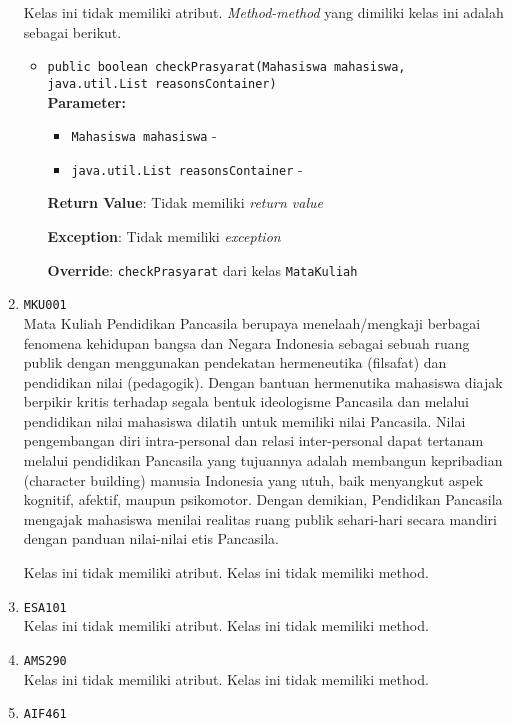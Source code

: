 \documentclass{article}
\begin{document}
\begin{enumerate}
Kelas ini tidak memiliki atribut. \textit{Method-method} yang dimiliki kelas ini adalah sebagai berikut.
\begin{itemize}
\item \texttt{public boolean checkPrasyarat(Mahasiswa mahasiswa, java.util.List reasonsContainer)}\\ 


\textbf{Parameter:}\begin{itemize}
\item \texttt{Mahasiswa mahasiswa} - 
\item \texttt{java.util.List reasonsContainer} - 
\end{itemize}
\textbf{Return Value}: Tidak memiliki \textit{return value}

\textbf{Exception}: Tidak memiliki \textit{exception}

\textbf{Override}: \texttt{checkPrasyarat} dari kelas \texttt{MataKuliah}

\end{itemize}
\item \texttt{MKU001}\\ 
Mata Kuliah Pendidikan Pancasila berupaya menelaah/mengkaji berbagai fenomena kehidupan 
 bangsa dan Negara Indonesia sebagai sebuah ruang publik dengan menggunakan pendekatan 
 hermeneutika (filsafat) dan pendidikan nilai (pedagogik). Dengan bantuan hermenutika
 mahasiswa diajak berpikir kritis terhadap segala bentuk ideologisme Pancasila dan melalui 
 pendidikan nilai mahasiswa dilatih untuk memiliki nilai Pancasila. Nilai pengembangan diri 
 intra-personal dan relasi inter-personal dapat tertanam melalui pendidikan Pancasila yang 
 tujuannya adalah membangun kepribadian (character building) manusia Indonesia yang utuh, 
 baik menyangkut aspek kognitif, afektif, maupun psikomotor. Dengan demikian, Pendidikan 
 Pancasila mengajak mahasiswa menilai realitas ruang publik sehari-hari secara mandiri 
 dengan panduan nilai-nilai etis Pancasila.

Kelas ini tidak memiliki atribut. Kelas ini tidak memiliki method. \item \texttt{ESA101}\\ 


Kelas ini tidak memiliki atribut. Kelas ini tidak memiliki method. \item \texttt{AMS290}\\ 


Kelas ini tidak memiliki atribut. Kelas ini tidak memiliki method. \item \texttt{AIF461}\\ 



\end{enumerate}
\end{document}
